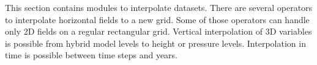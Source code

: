 This section contains modules to interpolate datasets.
There are several operators to interpolate horizontal fields
to a new grid. Some of those operators can handle only
2D fields on a regular rectangular grid.
Vertical interpolation of 3D variables is possible from
hybrid model levels to height or pressure levels.
Interpolation in time is possible between time steps and years.
